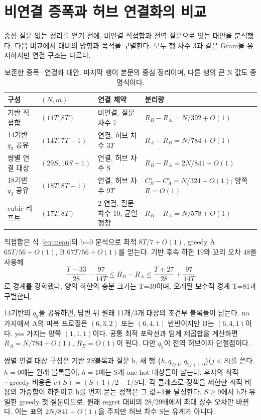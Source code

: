 \documentclass[11pt,a4paper]{article}
\theoremstyle{definition}
\theoremstyle{remark}\newtheorem{remark}[theorem]{주석}
\newcommand{\Opt}{C^{\star}}
\begin{document}
\section{비연결 증폭과 허브 연결화의 비교}\label{app:hub}
중심 질문 없는 정리를 얻기 전에, 비연결 직접합과 전역 질문으로 잇는 대안을 분석했다. 다음 비교에서 대비의 방향과 목적을 구별한다. 모두 행 차수 3과 같은 Gram을 유지하지만 연결 구조는 다르다.
\begin{table}[htbp]\centering\small
\caption{보존한 증폭·연결화 대안. 마지막 행이 본문의 중심 정리이며, 다른 행의 큰 N 값도 증명식이다.}\label{tab:families}
\begin{tabularx}{\linewidth}{p{24mm}p{28mm}p{29mm}Y}\toprule
구성&$(N,m)$&연결 제약&분리량\\\midrule
기반 직접합&$(14T,8T)$&비연결, 질문 차수 7&$R_B-R_A=N/392+O(1)$\\
14기반 $q_3$ 공유&$(14T,7T+1)$&연결, 허브 차수 $3T$&$R_A-R_B=N/784+O(1)$\\
쌍별 연결 대상&$(29S,16S+1)$&연결, 허브 차수 S&$R_B-R_A=2N/841+O(1)$\\
18기반 $q_3$ 공유&$(18T,8T+1)$&연결, 허브 차수 $9T$&$\Opt_B-\Opt_A=N/324+O(1)$; 양쪽 $R=O(1)$\\
cubic 리프트&$(17T,8T)$&2-연결, 질문 차수 10, 균일 팽창&$R_B-R_A=N/578+O(1)$\\\bottomrule
\end{tabularx}
\end{table}

직접합은 식~\eqref{eq:mean}의 b=0 분석으로 최적 $8T/7+O(1)$, greedy A $65T/56+O(1)$, B $67T/56+O(1)$를 얻는다. 기반 후속 하한 19와 꼬리 오차 48을 사용해
\[
 \frac{T-33}{28}-\frac{97}{14T}\le R_B-R_A\le\frac{T+27}{28}+\frac{97}{14T}
\]
로 경계를 강화했다. 양의 하한의 충분 크기는 T=39이며, 오래된 보수적 경계 T=81과 구별한다.

14기반의 $q_3$을 공유하면, 답변 뒤 원래 11개/3개 대상의 조건부 블록들이 남는다. no 가지에서 A의 피복 프로필은 $(6,3,2)$ 또는 $(6,4,1)$ 반반이지만 B는 $(6,4,1)$이다. yes 가지는 양쪽 $(1,1,1)$이다. 공통 최적 포락선과 임계 제곱합을 계산하면 $R_A=N/784+O(1)$, $R_B=O(1)$이 된다. 다만 $q_3$이 전역 허브이자 단절점이다.

쌍별 연결 대상 구성은 기반 $2S$블록과 질문 h, 새 행 $\{h,q_{2j,0},q_{2j+1,0}\}$($j<S$)를 쓴다. $h=0$에는 원래 블록들이, $h=1$에는 S개 one-hot 대상들이 남는다. 후자의 최적·greedy 비용은 $c(S)=(S+1)/2-1/S$다. 각 클래스로 정책을 제한한 최적 비용의 가중합이 하한이고 h를 먼저 묻는 정책은 그 값+1을 달성한다. $S\ge9$에서 h가 유일한 greedy 첫 질문이므로, 원래 regret 대비의 $28/29$배에서 최대 상수 오차만 바뀐다. 이는 표의 $2N/841+O(1)$을 주지만 허브 차수 S는 유계가 아니다.
\end{document}
